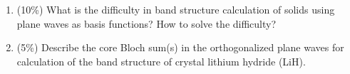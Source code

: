 \begin{enumerate}[label=\textbf{\arabic*.}]
\begin{enumerate}[label=(\alph*)]
\item (5\%) From (a), how many bands will you have?
\item (5\%) From (b), how many bands will be fully filled by valence electrons for the silicon crystal in the ground state?
\end{enumerate}
\item (10\%) What is the difficulty in band structure calculation of solids using plane waves as basis functions? How to solve the difficulty?
\item (5\%) Describe the core Bloch sum(s) in the orthogonalized plane waves for calculation of the band structure of crystal lithium hydride (LiH).
\end{enumerate}
